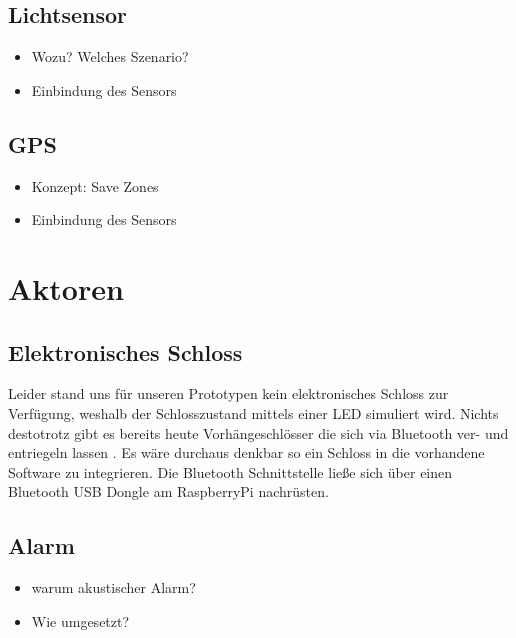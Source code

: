 \documentclass{sigchi}
\begin{document}
\subsection{Lichtsensor}\label{ssec:lichtsensor}

\begin{itemize}
  \item Wozu? Welches Szenario?
  \item Einbindung des Sensors
\end{itemize}

\subsection{GPS}

\begin{itemize}
  \item Konzept: Save Zones
  \item Einbindung des Sensors
\end{itemize}

\section{Aktoren}

\subsection{Elektronisches Schloss}
Leider stand uns für unseren Prototypen kein elektronisches Schloss
zur Verfügung, weshalb der Schlosszustand mittels einer LED simuliert
wird. Nichts destotrotz gibt es bereits heute Vorhängeschlösser die
sich via Bluetooth ver- und entriegeln lassen \cite{MasterLock:Bluetooth}.
Es wäre durchaus denkbar so ein Schloss in die vorhandene Software
zu integrieren. Die Bluetooth Schnittstelle ließe sich über einen
Bluetooth USB Dongle am RaspberryPi nachrüsten. 

\subsection{Alarm}

\begin{itemize}
  \item warum akustischer Alarm?
  \item Wie umgesetzt?  
\end{itemize}
\end{document}
